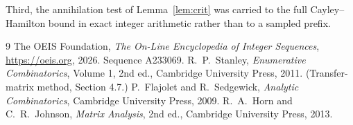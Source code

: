 \documentclass[11pt,a4paper]{article}
\theoremstyle{plain}
\theoremstyle{definition}
\begin{document}
Third, the annihilation test of Lemma~\ref{lem:crit} was carried to the full
Cayley--Hamilton bound in exact integer arithmetic rather than to a sampled prefix.

\begin{thebibliography}{9}
 The OEIS Foundation, \emph{The On-Line Encyclopedia of Integer
Sequences}, \url{https://oeis.org}, 2026. Sequence A233069.
 R.~P.~Stanley, \emph{Enumerative Combinatorics}, Volume 1, 2nd ed.,
Cambridge University Press, 2011. (Transfer-matrix method, Section 4.7.)
 P.~Flajolet and R.~Sedgewick, \emph{Analytic Combinatorics}, Cambridge
University Press, 2009.
 R.~A.~Horn and C.~R.~Johnson, \emph{Matrix Analysis}, 2nd ed., Cambridge
University Press, 2013.
\end{thebibliography}
\end{document}
